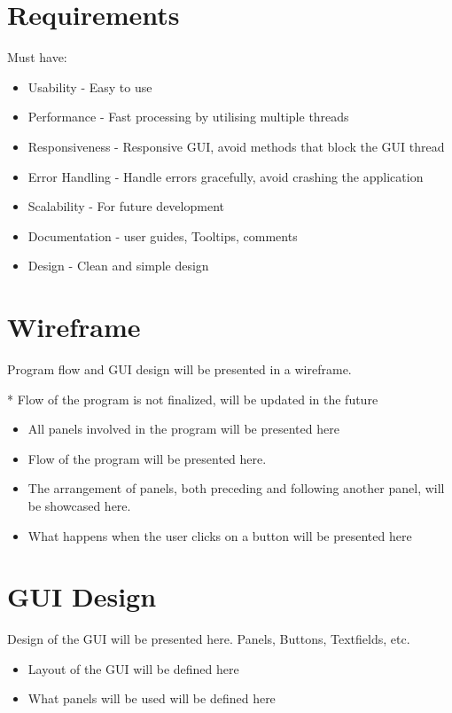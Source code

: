 \section{Requirements}

Must have:
\begin{itemize}
	\item Usability - Easy to use
	\item Performance - Fast processing by utilising multiple threads
	\item Responsiveness - Responsive GUI, avoid methods that block the GUI thread
	\item Error Handling - Handle errors gracefully, avoid crashing the application
	\item Scalability - For future development
	\item Documentation - user guides, Tooltips, comments
	\item Design - Clean and simple design
\end{itemize}

\section{Wireframe}
Program flow and GUI design will be presented in a wireframe.

* Flow of the program is not finalized, will be updated in the future

\begin{itemize}
	\item All panels involved in the program will be presented here
	\item Flow of the program will be presented here.
	\item The arrangement of panels, both preceding and following another panel, will be showcased here.
	\item What happens when the user clicks on a button will be presented here
\end{itemize}

\section{GUI Design}
Design of the GUI will be presented here. Panels, Buttons, Textfields, etc.

\begin{itemize}
	\item Layout of the GUI will be defined here
	\item What panels will be used will be defined here
\end{itemize}

